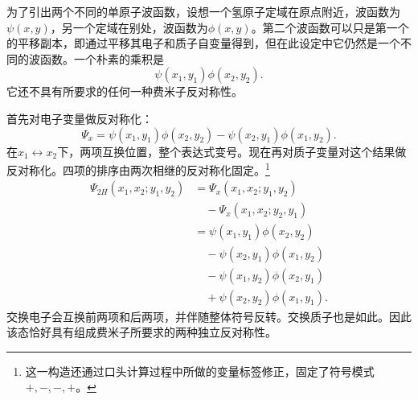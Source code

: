 为了引出两个不同的单原子波函数，设想一个氢原子定域在原点附近，波函数为\(\psi(x,y)\)，另一个定域在别处，波函数为\(\phi(x,y)\)。第二个波函数可以只是第一个的平移副本，即通过平移其电子和质子自变量得到，但在此设定中它仍然是一个不同的波函数。一个朴素的乘积是
\begin{equation}
\psi(x_1,y_1)\phi(x_2,y_2).
\end{equation}
它还不具有所要求的任何一种费米子反对称性。

首先对电子变量做反对称化：
\begin{equation}
\Psi_x=
\psi(x_1,y_1)\phi(x_2,y_2)
-\psi(x_2,y_1)\phi(x_1,y_2).
\end{equation}
在\(x_1\leftrightarrow x_2\)下，两项互换位置，整个表达式变号。现在再对质子变量对这个结果做反对称化。四项的排序由两次相继的反对称化固定。\footnote{这一构造还通过口头计算过程中所做的变量标签修正，固定了符号模式\(+,-,-,+\)。}
\begin{align}
\Psi_{2H}(x_1,x_2;y_1,y_2)
&=\Psi_x(x_1,x_2;y_1,y_2)\nonumber\\
&\quad{}-\Psi_x(x_1,x_2;y_2,y_1)\\
&=\psi(x_1,y_1)\phi(x_2,y_2)\nonumber\\
&\quad{}-\psi(x_2,y_1)\phi(x_1,y_2)\nonumber\\
&\quad{}-\psi(x_1,y_2)\phi(x_2,y_1)\nonumber\\
&\quad{}+\psi(x_2,y_2)\phi(x_1,y_1).
\label{eq:two-hydrogen-antisymmetrized}
\end{align}
交换电子会互换前两项和后两项，并伴随整体符号反转。交换质子也是如此。因此该态恰好具有组成费米子所要求的两种独立反对称性。

\begin{classroomqa}
\end{classroomqa}

\begin{classroomqa}
\end{classroomqa}

